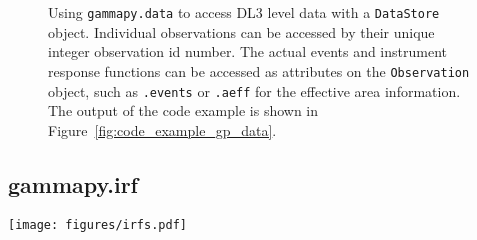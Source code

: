 \documentclass[longauth]{aa}
\newcommand{\code}[1]{\texttt{#1}}
\newcommand{\hess}{H.E.S.S.\xspace}
\newcommand{\hawc}{HAWC\xspace}
\newcommand{\magic}{MAGIC\xspace}
\newcommand{\cta}{CTA\xspace}
\newcommand{\fermi}{Fermi-LAT\xspace}
\begin{document}
\begin{figure}
        \small
        \caption{
        Using \code{gammapy.data} to access DL3 level data with a \code{DataStore} object.
        Individual observations can be accessed by their unique integer observation id number.
        The actual events and instrument response functions can be accessed
        as attributes on the \code{Observation} object, such as \code{.events}
        or \code{.aeff} for the effective area information. The output
                of the code example is shown in Figure~\ref{fig:code_example_gp_data}.
    }
        \label{fig*:minted:gp_data}
\end{figure}
%

\subsection{gammapy.irf}
\label{ssec:gammapy-irf}
%
%
\begin{figure*}[t]
        \centering
        \texttt{[image: figures/irfs.pdf]}
        \caption{
                Using \code{gammapy.irf} to read and plot instrument response functions.
                The left panel shows the effective area as a function of energy for
                the \cta, \hess, \magic, \hawc and \fermi instruments. The right panel shows
                the $68\%$ containment radius of the PSF as a function of energy for the \cta, \hess
                and \fermi instruments. The \cta IRFs are from the \enquote{prod5} production for the {\it alpha} configuration of the south and north array. The \hess IRFs are from the DL3 DR1,
        using observation ID 033787. The \magic effective area is computed for a
        $20\,{\rm min}$ observation at the Crab Nebula coordinates. The
                \fermi IRFs use \enquote{pass8} data and are also taken at the position of the Crab Nebula.
                The \hawc effective area is shown for the event classes $N_{Hit}=5 - 9$ as light gray
                lines along with the sum of all event classes as a black line. The \hawc IRFs are taken from
                the first public release of events data by the \hawc collaboration. All IRFs do not correspond
                to the latest performance of the instruments, but still are representative of the 
                detector type and energy range. We exclusively relied on publicly available
                data provided by the collaborations. The data is also available in the
                \code{gammapy-data} repository.
    }
        \label{fig:irfs}
\end{figure*}
%
\end{document}
